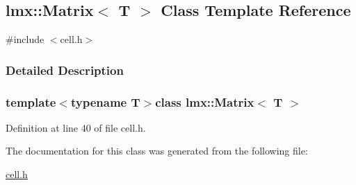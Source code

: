 \hypertarget{classlmx_1_1_matrix}{}\subsection{lmx\+:\+:Matrix$<$ T $>$ Class Template Reference}
\label{classlmx_1_1_matrix}


{\ttfamily \#include $<$cell.\+h$>$}



\subsubsection{Detailed Description}
\subsubsection*{template$<$typename T$>$class lmx\+::\+Matrix$<$ T $>$}



Definition at line 40 of file cell.\+h.



The documentation for this class was generated from the following file\+:\begin{DoxyCompactItemize}
\item 
\hyperlink{cell_8h}{cell.\+h}\end{DoxyCompactItemize}
